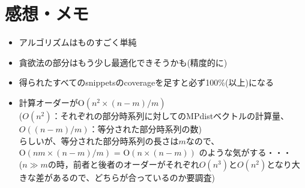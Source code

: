 \documentclass{jsarticle}
\begin{document}
\section{感想・メモ}
\begin{itemize}
\item アルゴリズムはものすごく単純
\item 貪欲法の部分はもう少し最適化できそうかも(精度的に) 
\item 得られたすべてのsnippetsのcoverageを足すと必ず100\%(以上)になる
\item 計算オーダーが$\mathrm{O}(n^2 \times (n-m)/m)$\\($O(n^2)$：それぞれの部分時系列に対してのMPdistベクトルの計算量、$O((n-m)/m)$：等分された部分時系列の数)\\らしいが、等分された部分時系列の長さは$m$なので、$\mathrm{O}(nm \times (n-m)/m)$ = $\mathrm{O}(n \times (n-m))$ のような気がする・・・\\
($n\gg m$の時，前者と後者のオーダーがそれぞれ$O(n^3)$と$O(n^2)$となり大きな差があるので、どちらが合っているのか要調査)
\end{itemize}
\end{document}
